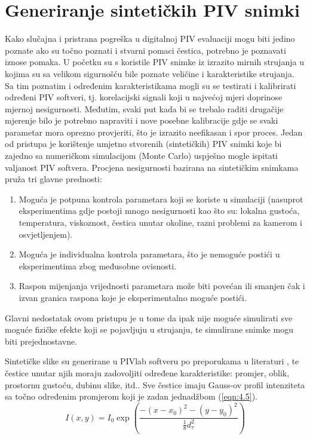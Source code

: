 \section{Generiranje sintetičkih PIV snimki}
Kako slučajna i pristrana pogreška u digitalnoj PIV evaluaciji mogu biti jedino poznate ako su točno poznati i stvarni pomaci čestica, potrebno je poznavati iznose pomaka. U početku su s koristile PIV snimke iz izrazito mirnih strujanja u kojima su sa velikom sigurnošću bile poznate veličine i karakteristike strujanja. Sa tim poznatim i određenim karakteristikama mogli su se testirati i kalibrirati određeni PIV softveri, tj. korelacijski signali koji u najvećoj mjeri doprinose mjernoj nesigurnosti. Međutim, svaki put kada bi se trebalo raditi drugačije mjerenje bilo je potrebno napraviti i nove posebne kalibracije gdje se svaki parametar mora oprezno provjeriti, što je izrazito neefikasan i spor proces. Jedan od pristupa je korištenje umjetno stvorenih (sintetičkih) PIV snimki koje bi zajedno sa numeričkom simulacijom (Monte Carlo) uspješno mogle ispitati valjanost PIV softvera. Procjena nesigurnosti bazirana na sintetičkim snimkama pruža tri glavne prednosti:
\begin{enumerate}[label=\textbf{\arabic*)}, leftmargin=*, align=left, itemsep=0em, topsep=0em]
	\item Moguća je potpuna kontrola parametara koji se koriste u simulaciji (nasuprot eksperimentima gdje postoji mnogo nesigurnosti kao što su: lokalna gustoća, temperatura, viskoznost, čestica unutar okoline, razni problemi za kamerom i osvjetljenjem).
	\item Moguća je individualna kontrola parametara, što je nemoguće postići u eksperimentima zbog međusobne ovisnosti.
	\item Raspon mijenjanja vrijednosti parametara može biti povećan ili smanjen čak i izvan granica raspona koje je eksperimentalno moguće postići.
\end{enumerate}
Glavni nedostatak ovom pristupu je u tome da ipak nije moguće simulirati sve moguće fizičke efekte koji se pojavljuju u strujanju, te simulirane snimke mogu biti prejednostavne.
\par
Sintetičke slike su generirane u PIVlab softveru po preporukama u literaturi \cite{raffel2018_book}, te čestice unutar njih moraju zadovoljiti određene karakteristike: promjer, oblik, prostornu gustoću, dubinu slike, itd.. Sve čestice imaju Gauss-ov profil intenziteta sa točno određenim promjerom koji je zadan jednadžbom (\ref{eqn:4.5}). 
\begin{equation}
	I(x, y) = I_{0} \exp\left(\frac{-(x-x_{0})^{2}-(y-y_{0})^{2}}{\frac{1}{8}d_{\tau}^{2}}\right)
	\label{eqn:4.5}
\end{equation}
